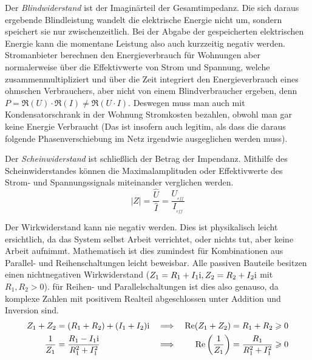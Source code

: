Der \textit{Blindwiderstand} ist der Imaginärteil der Gesamtimpedanz. Die sich daraus 
ergebende Blindleistung wandelt die elektrische Energie nicht um, sondern speichert sie nur zwischenzeitlich. Bei der Abgabe der gespeicherten elektrischen Energie kann die momentane
Leistung also auch kurzzeitig negativ werden.
Stromanbieter berechnen den Energieverbrauch für Wohnungen aber normalerweise über die Effektivwerte von 
Strom und Spannung, welche zusammenmultipliziert und über die Zeit integriert den Energieverbrauch eines ohmschen Verbrauchers, aber nicht von einem Blindverbraucher ergeben, denn $P = \Re(U) \cdot \Re(I) \neq \Re(U \cdot I)$.
Deswegen muss man auch mit Kondensatorschrank in der Wohnung Stromkosten bezahlen, obwohl man gar keine Energie Verbraucht (Das ist insofern auch legitim, als dass die daraus folgende Phasenverschiebung im Netz irgendwie ausgeglichen werden muss).
%
%

Der \textit{Scheinwiderstand} ist schließlich der Betrag der Impendanz.
Mithilfe des Scheinwiderstandes können die Maximalamplituden oder Effektivwerte des Strom- und Spannungssignals miteinander verglichen werden.
$$|Z| = \frac{\hat{U}}{\hat{I}} = \frac{U__{eff}}{I__{eff}}$$

Der Wirkwiderstand kann nie negativ werden. Dies ist physikalisch leicht ersichtlich, da das System selbst Arbeit verrichtet, oder nichts tut, aber keine Arbeit aufnimmt. Mathematisch ist dies zumindest für Kombinationen aus Parallel- und Reihenschaltungen leicht beweisbar. Alle passiven Bauteile besitzen einen nichtnegativen Wirkwiderstand ($Z_1=R_1+I_1\mathrm{i}, Z_2=R_2+I_2\mathrm{i}$ mit $R_1, R_2 > 0$). für Reihen- und Parallelschaltungen ist dies also genauso, da komplexe Zahlen mit positivem Realteil abgeschlossen unter Addition und Inversion sind.
\begin{align*}
    Z_1 + Z_2 &= (R_1+R_2) + (I_1 + I_2)\mathrm{i} 
    &\implies&& \Re(Z_1 + Z_2) &= R_1+R_2 \geqslant 0\\
    \frac{1}{Z_1} &= \frac{R_1-I_1\mathrm{i}}{R_1^2 + I_1^2}
    &\implies&& \Re\qty(\frac{1}{Z_1}) &= \frac{R_1}{R_1^2 + I_1^2} \geqslant 0
\end{align*}
%
%
%
